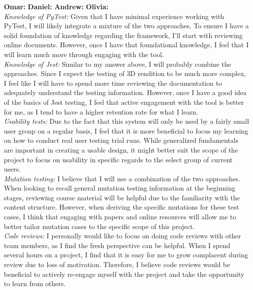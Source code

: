 \documentclass[12pt, titlepage]{article}
\begin{document}
\begin{enumerate}
  \textbf{Omar: }
  \newline
  \textbf{Daniel: }
  \newline
  \textbf{Andrew: }
  \newline
  \textbf{Olivia: }\\
  \textit{Knowledge of PyTest:} Given that I have minimal experience working with PyTest, I will likely integrate a mixture of the two approaches. To ensure I have a solid foundation of knowledge regarding the framework, I’ll start with reviewing online documents. However, once I have that foundational knowledge, I feel that I will learn much more through engaging with the tool.\\
  \textit{Knowledge of Jest:} Similar to my answer above, I will probably combine the approaches. Since I expect the testing of 3D rendition to be much more complex, I feel like I will have to spend more time reviewing the documentation to adequately understand the testing information. However, once I have a good idea of the basics of Jest testing, I feel that active engagement with the tool is better for me, as I tend to have a higher retention rate for what I learn.\\
  \textit{Usability tests:} Due to the fact that this system will only be used by a fairly small user group on a regular basis, I feel that it is more beneficial to focus my learning on how to conduct real user testing trial runs. While generalized fundamentals are important in creating a usable design, it might better suit the scope of the project to focus on usability in specific regards to the select group of current users.\\
  \textit{Mutation testing:} I believe that I will use a combination of the two approaches. When looking to recall general mutation testing information at the beginning stages, reviewing course material will be helpful due to the familiarity with the content structure. However, when deriving the specific mutations for these test cases, I think that engaging with papers and online resources will allow me to better tailor mutation cases to the specific scope of this project.\\
  \textit{Code reviews:} I personally would like to focus on doing code reviews with other team members, as I find the fresh perspective can be helpful. When I spend several hours on a project, I find that it is easy for me to grow complacent during review due to loss of motivation. Therefore, I believe code reviews would be beneficial to actively re-engage myself with the project and take the opportunity to learn from others.


\end{enumerate}
\end{document}
